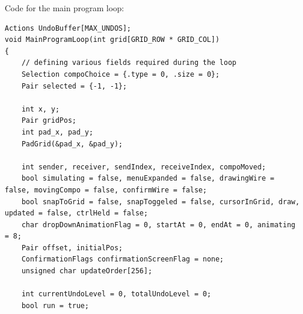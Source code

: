 \documentclass[report]{subfiles}
\begin{document}
    Code for the main program loop:
    \begin{lstlisting}
Actions UndoBuffer[MAX_UNDOS];
void MainProgramLoop(int grid[GRID_ROW * GRID_COL])
{
    // defining various fields required during the loop
    Selection compoChoice = {.type = 0, .size = 0};
    Pair selected = {-1, -1};

    int x, y;
    Pair gridPos;
    int pad_x, pad_y;
    PadGrid(&pad_x, &pad_y);

    int sender, receiver, sendIndex, receiveIndex, compoMoved;
    bool simulating = false, menuExpanded = false, drawingWire = false, movingCompo = false, confirmWire = false;
    bool snapToGrid = false, snapToggeled = false, cursorInGrid, draw, updated = false, ctrlHeld = false;
    char dropDownAnimationFlag = 0, startAt = 0, endAt = 0, animating = 8;
    Pair offset, initialPos;
    ConfirmationFlags confirmationScreenFlag = none;
    unsigned char updateOrder[256];

    int currentUndoLevel = 0, totalUndoLevel = 0;
    bool run = true;


\end{lstlisting}
\end{document}
